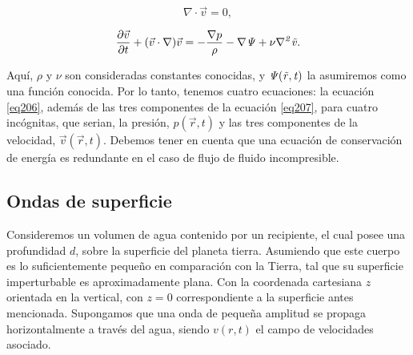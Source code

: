 \begin{equation}\label{eq206}
   \nabla \cdot \vec{v} = 0,
\end{equation}

\begin{equation}\label{eq207}
   \frac{\partial \vec{v}}{\partial t} + (\vec{v} \cdot \nabla ) \vec{v} = - \frac{\nabla p}{\rho}  - \nabla \it\Psi + \nu \nabla^2 \vec{v}.
\end{equation}

Aquí, $\rho$ y $\nu$ son consideradas constantes conocidas, y $\it\Psi(\vec{r},t)$ la asumiremos como una función conocida. Por lo tanto, tenemos cuatro ecuaciones: la ecuación \ref{eq206}, además de las tres componentes de la ecuación \ref{eq207}, para cuatro incógnitas, que serian, la presión, $p(\vec{r},t)$ y las tres componentes de la velocidad, $\vec{v}(\vec{r},t)$. Debemos tener en cuenta que una ecuación de conservación de energía es redundante en el caso de flujo de fluido incompresible.


\subsection{Ondas de superficie}      

Consideremos un volumen de agua contenido por un recipiente, el cual posee una profundidad $d$, sobre la superficie del planeta tierra. Asumiendo que este cuerpo es lo suficientemente pequeño en comparación con la Tierra, tal que su superficie imperturbable es aproximadamente plana. Con la coordenada cartesiana $z$ orientada en la vertical, con $z = 0$ correspondiente a la superficie antes mencionada. Supongamos que una onda de pequeña amplitud se propaga horizontalmente a través del agua, siendo $v(r, t)$ el campo de velocidades asociado.

